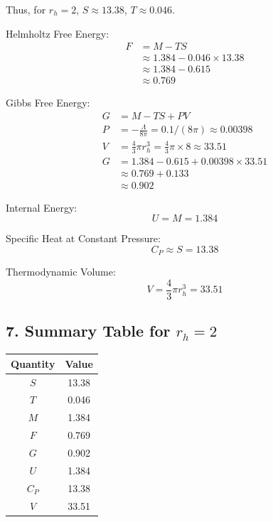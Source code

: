\documentclass[12pt]{article}
\begin{document}
Thus, for $r_h = 2$, $S \approx 13.38$, $T \approx 0.046$.

Helmholtz Free Energy:
\begin{align*}
F &= M - T S \\
  &\approx 1.384 - 0.046 \times 13.38 \\
  &\approx 1.384 - 0.615 \\
  &\approx 0.769
\end{align*}

Gibbs Free Energy:
\begin{align*}
G &= M - T S + P V \\
P &= -\frac{\Lambda}{8\pi} = 0.1/(8\pi) \approx 0.00398 \\
V &= \frac{4}{3}\pi r_h^3 = \frac{4}{3}\pi \times 8 \approx 33.51 \\
G &= 1.384 - 0.615 + 0.00398 \times 33.51 \\
  &\approx 0.769 + 0.133 \\
  &\approx 0.902
\end{align*}

Internal Energy:
\begin{equation}
U = M = 1.384
\end{equation}

Specific Heat at Constant Pressure:
\begin{equation}
C_P \approx S = 13.38
\end{equation}

Thermodynamic Volume:
\begin{equation}
V = \frac{4}{3}\pi r_h^3 = 33.51
\end{equation}

\subsection*{7. Summary Table for $r_h = 2$}
\begin{center}
\begin{tabular}{|c|c|}
\hline
Quantity & Value \\
\hline
$S$ & 13.38 \\
$T$ & 0.046 \\
$M$ & 1.384 \\
$F$ & 0.769 \\
$G$ & 0.902 \\
$U$ & 1.384 \\
$C_P$ & 13.38 \\
$V$ & 33.51 \\
\hline
\end{tabular}
\end{center}
\end{document}
